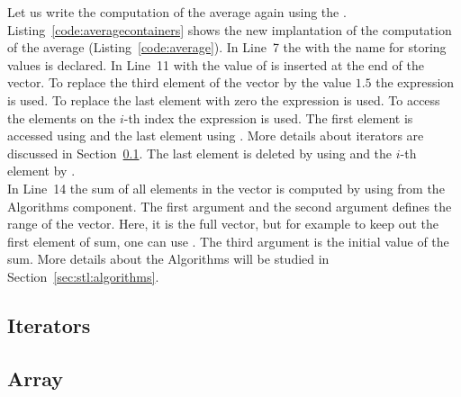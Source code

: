 Let us write the computation of the average again using the . Listing~\ref{code:averagecontainers} shows the new implantation of the computation of the average (Listing~\ref{code:average}). In Line~7 the  with the name  for storing  values is declared. In Line~11 with  the value of  is inserted at the end of the vector. To replace the third element of the vector by the value $1.5$ the expression  is used. To replace the last element with zero the expression  is used. To access the elements on the $i$-th index the expression  is used. The first element is accessed using  and the last element using . More details about iterators are discussed in Section~\ref{ref:stl:iterators}. The last element is deleted by using  and the $i$-th element by .\\


In Line~14 the sum of all elements in the vector is computed by using  from the Algorithms component. The first argument  and the second argument  defines the range of the vector. Here, it is the full vector, but for example to keep out the first element of sum, one can use . The third argument is the initial value of the sum. More details about the Algorithms will be studied in Section~\ref{sec:stl:algorithms}.



\subsection{Iterators}
\label{ref:stl:iterators}

\subsection{Array}


